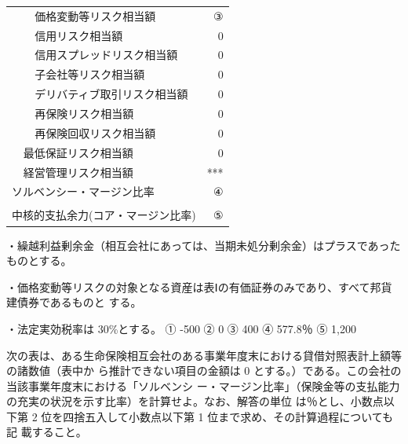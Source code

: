 \documentclass[report,gutter=10mm,fore-edge=10mm,uplatex,dvipdfmx]{jlreq}
\begin{document}
\begin{tabular}{|l|l|l|l|r|}
&& \multicolumn{2}{l|}{価格変動等リスク相当額} & ③ \\ \cline{3-5}
&& \multicolumn{2}{l|}{信用リスク相当額} & 0 \\ \cline{3-5}
&& \multicolumn{2}{l|}{信用スプレッドリスク相当額} & 0 \\ \cline{3-5}
&& \multicolumn{2}{l|}{子会社等リスク相当額} & 0 \\ \cline{3-5}
&& \multicolumn{2}{l|}{デリバティブ取引リスク相当額} & 0 \\ \cline{3-5}
&& \multicolumn{2}{l|}{再保険リスク相当額} & 0 \\ \cline{3-5}
&& \multicolumn{2}{l|}{再保険回収リスク相当額} & 0 \\ \cline{2-5}
& \multicolumn{3}{|l|}{最低保証リスク相当額} & 0\\ \cline{2-5}
& \multicolumn{3}{|l|}{経営管理リスク相当額} & ***\\ \cline{1-5}
 \multicolumn{4}{|l|}{ソルベンシー・マージン比率 } & ④\\ \cline{1-5}
 \multicolumn{5}{c}{  }\\\cline{1-5}
 \multicolumn{4}{|l|}{中核的支払余力(コア・マージン比率)} & ⑤\\ \cline{1-5}
\end{tabular}

・繰越利益剰余金（相互会社にあっては、当期未処分剰余金）はプラスであったものとする。

・価格変動等リスクの対象となる資産は表Ⅰの有価証券のみであり、すべて邦貨建債券であるものと
する。

・法定実効税率は 30\%とする。
\answer{}
① -500  ② 0  ③ 400  ④ 577.8％  ⑤  1,200 


次の表は、ある生命保険相互会社のある事業年度末における貸借対照表計上額等の諸数値（表中か
ら推計できない項目の金額は 0 とする。）である。この会社の当該事業年度末における「ソルベンシ
ー・マージン比率」（保険金等の支払能力の充実の状況を示す比率）を計算せよ。なお、解答の単位
は％とし、小数点以下第 2 位を四捨五入して小数点以下第 1 位まで求め、その計算過程についても記
載すること。
\end{document}
